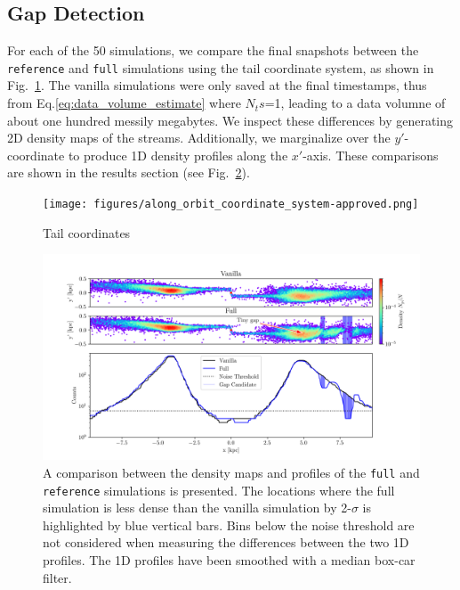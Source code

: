 \documentclass{aa}
\begin{document}
\begin{appendix}
  
  
  \section{Gap Detection} \label{sec:gap_detection}
    For each of the 50 simulations, we compare the final snapshots between the \texttt{reference} and \texttt{full} simulations using the tail coordinate system, as shown in Fig.~\ref{fig:TailCoordinates}. The vanilla simulations were only saved at the final timestamps, thus from Eq.\ref{eq:data_volume_estimate} where $N_ts$=1, leading to a data volumne of about one hundred messily megabytes. We inspect these differences by generating 2D density maps of the streams. Additionally, we marginalize over the $y'$-coordinate to produce 1D density profiles along the $x'$-axis. These comparisons are shown in the results section (see Fig.~\ref{fig:profiles}).
    \begin{figure}
      \centering
      \texttt{[image: figures/along\_orbit\_coordinate\_system-approved.png]}
      \caption{Tail coordinates}
      \label{fig:TailCoordinates}
    \end{figure}
  
    \begin{figure}
      \centering
      \includegraphics[width=\linewidth, trim=20 0 15 0]{monte-carlo-009-pouliasis2017pii-GCNBody-2000-milisigma-5-noisefactor-20-boxcarindexlength-shifted-0.png}
      \caption{A comparison between the density maps and profiles of the \texttt{full} and \texttt{reference} simulations is presented. The locations where the full simulation is less dense than the vanilla simulation by 2-$\sigma$ is highlighted by blue vertical bars. Bins below the noise threshold are not considered when measuring the differences between the two 1D profiles. The 1D profiles have been smoothed with a median box-car filter.}
      \label{fig:profiles}
      \end{figure}


\end{appendix}
\end{document}
